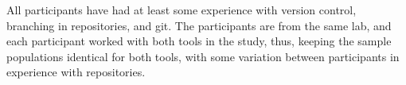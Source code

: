 All participants have had at least some experience with version control,
branching in repositories, and git. The participants are from the same
lab, and each participant worked with both tools in the study, thus,
keeping the sample populations identical for both tools, with some
variation between participants in experience with repositories.
